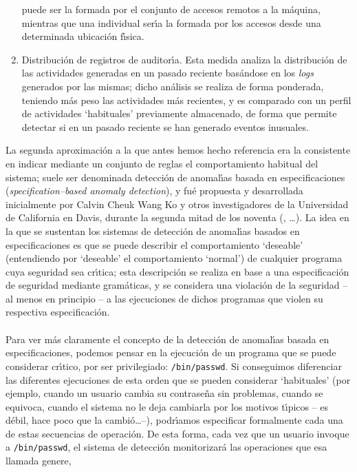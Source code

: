 \begin{enumerate}
puede ser la formada por el conjunto de accesos remotos a la m\'aquina, 
mientras que una individual ser\'{\i}a la formada por los accesos desde una
determinada ubicaci\'on f\'{\i}sica.
\item Distribuci\'on de registros de auditor\'{\i}a. Esta medida analiza la
distribuci\'on de las actividades generadas en un pasado reciente bas\'andose
en los {\it logs} generados por las mismas; dicho an\'alisis se realiza de forma
ponderada, teniendo m\'as peso las actividades m\'as recientes, y es comparado
con un perfil de actividades `habituales' previamente almacenado, de forma
que permite detectar si en un pasado reciente se han generado eventos
inusuales.
\end{enumerate}
La segunda aproximaci\'on a la que antes hemos hecho referencia era la 
consistente en indicar me\-dian\-te un conjunto de reglas el comportamiento 
habitual
del sistema; suele ser denominada detecci\'on de anomal\'{\i}as basada en 
especificaciones ({\it specification--based anomaly detection}), y fu\'e 
propuesta y desarrollada inicialmente por Calvin Cheuk Wang Ko y otros 
investigadores de la Universidad de California en Davis, durante la segunda 
mitad de los noventa (\cite{kn:ko96}, \cite{kn:ko97}\ldots). La idea en la que
se sustentan los sistemas de detecci\'on de anomal\'{\i}as basados en 
especificaciones es que se puede describir el comportamiento `deseable' 
(entendiendo por `deseable' el comportamiento `normal') de cualquier programa
cuya seguridad sea cr\'{\i}tica; esta descripci\'on se realiza en base a una
especificaci\'on de seguridad mediante gram\'aticas, y se considera una 
violaci\'on  de la seguridad 
-- al menos en principio -- a las ejecuciones de dichos programas que violen su 
respectiva especificaci\'on.\\
\\Para ver m\'as claramente el concepto de la detecci\'on de anomal\'{\i}as
basada en especificaciones, podemos pensar en la ejecuci\'on de un programa que
se puede considerar cr\'{\i}tico, por ser privilegiado: {\tt /bin/passwd}. Si
conseguimos diferenciar las diferentes ejecuciones de esta orden que se pueden
considerar `habituales' (por ejemplo, cuando un usuario cambia su contrase\~na
sin problemas, cuando se equivoca, cuando el sistema no le deja cambiarla por
los motivos t\'{\i}picos -- es d\'ebil, hace poco que la cambi\'o\ldots --), 
podr\'{\i}amos especificar formalmente cada una de estas secuencias de 
operaci\'on. De esta forma, cada vez que un usuario invoque a {\tt /bin/passwd},
el sistema de detecci\'on monitorizar\'a las operaciones que esa llamada genere,
